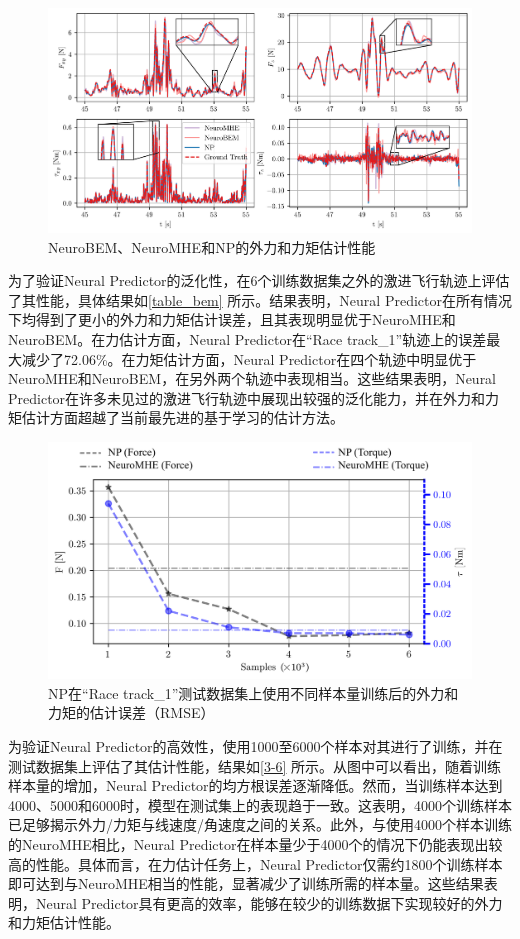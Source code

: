 \documentclass[lang=chs, degree=master, blindreview=false, winfonts=true]{yanputhesis}
\begin{document}
\begin{figure}[hbt!]
	\hspace{-0.6cm}  %
	\centering
	\includegraphics[width=39pc]{picture/bem_comparison.png} 
	\caption{NeuroBEM、NeuroMHE和NP的外力和力矩估计性能} 
	\label{3-5}
\end{figure}
为了验证Neural Predictor的泛化性，在6个训练数据集之外的激进飞行轨迹上评估了其性能，具体结果如\autoref{table_bem} 所示。结果表明，Neural Predictor在所有情况下均得到了更小的外力和力矩估计误差，且其表现明显优于NeuroMHE和NeuroBEM。在力估计方面，Neural Predictor在“Race track\_1”轨迹上的误差最大减少了72.06\%。在力矩估计方面，Neural Predictor在四个轨迹中明显优于NeuroMHE和NeuroBEM，在另外两个轨迹中表现相当。这些结果表明，Neural Predictor在许多未见过的激进飞行轨迹中展现出较强的泛化能力，并在外力和力矩估计方面超越了当前最先进的基于学习的估计方法。

\begin{figure}[hbt!]
	\centering
	\includegraphics[width=36pc]{picture/kk/sample_efficiency.png} 
	\caption{NP在“Race track\_1”测试数据集上使用不同样本量训练后的外力和力矩的估计误差（RMSE）} 
	\label{3-6}
\end{figure}
为验证Neural Predictor的高效性，使用1000至6000个样本对其进行了训练，并在测试数据集上评估了其估计性能，结果如\autoref{3-6} 所示。从图中可以看出，随着训练样本量的增加，Neural Predictor的均方根误差逐渐降低。然而，当训练样本达到4000、5000和6000时，模型在测试集上的表现趋于一致。这表明，4000个训练样本已足够揭示外力/力矩与线速度/角速度之间的关系。此外，与使用4000个样本训练的NeuroMHE相比，Neural Predictor在样本量少于4000个的情况下仍能表现出较高的性能。具体而言，在力估计任务上，Neural Predictor仅需约1800个训练样本即可达到与NeuroMHE相当的性能，显著减少了训练所需的样本量。这些结果表明，Neural Predictor具有更高的效率，能够在较少的训练数据下实现较好的外力和力矩估计性能。
\end{document}
